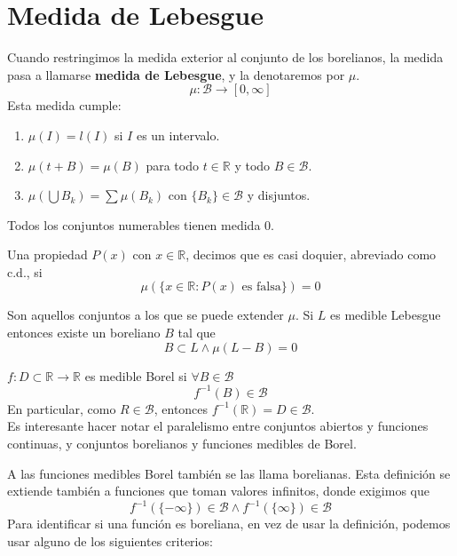 \documentclass{./Calculo.tex}
\begin{document}
\section{Medida de Lebesgue}
\begin{defin}
	Cuando restringimos la medida exterior al conjunto de los borelianos, la medida pasa a llamarse \textbf{medida de Lebesgue}, y la denotaremos por $\mu$. 
	\[
		\mu: \mathcal{B} \to [0,\infty]
	\]
	Esta medida cumple:
	\begin{enumerate}
		\item $\mu(I) = l(I)$ si $I$ es un intervalo.  
		\item $\mu(t+B) = \mu(B)$ para todo $t \in \mathbb{R}$ y todo $B \in \mathcal{B}$.  
		\item $\mu(\bigcup B_{k}) = \sum \mu (B_{k})$ con $\{ B_{k} \} \in \mathcal{B}$ y disjuntos. 
	\end{enumerate}
\end{defin}
Todos los conjuntos numerables tienen medida $0$. \\
\begin{defin}
Una propiedad $P(x)$ con $x \in \mathbb{R}$, decimos que es casi doquier, abreviado como c.d., si  
\[
	\mu(\{ x \in \mathbb{R} : P(x) \text{ es falsa} \}) = 0
\]
\end{defin}
\begin{defin}
	Son aquellos conjuntos a los que se puede extender $\mu$. Si $L$ es medible Lebesgue entonces existe un boreliano $B$ tal que   
	\[
		B \subset L \wedge \mu(L-B) = 0
	\]
\end{defin}
\begin{defin}
	$f : D \subset \mathbb{R} \to \mathbb{R}$ es medible Borel si $\forall B \in \mathcal{B}$
	\[
		f^{-1}(B) \in \mathcal{B}
	\]
	En particular, como $R \in \mathcal{B}$, entonces $f^{-1}(\mathbb{R}) = D \in \mathcal{B}$.\\
	Es interesante hacer notar el paralelismo entre conjuntos abiertos y funciones continuas, y conjuntos borelianos y funciones medibles de Borel.
\end{defin}
A las funciones medibles Borel también se las llama borelianas. Esta definición se extiende también a funciones que toman valores infinitos, donde exigimos que
\[
	f^{-1}(\{ -\infty \}) \in \mathcal{B} \wedge f^{-1}(\{ \infty \}) \in \mathcal{B}
\]
Para identificar si una función es boreliana, en vez de usar la definición, podemos usar alguno de los siguientes criterios:
\end{document}
